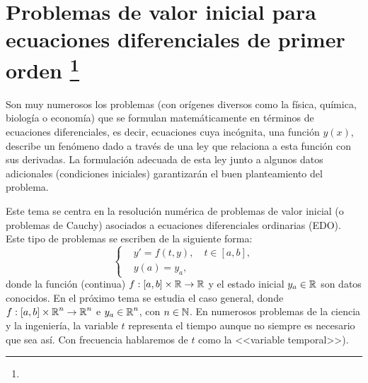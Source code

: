%
%
\renewcommand{\tt}{t}
\newcommand{\yy}{y}
\newcommand{\yn}{{\yy_n}}
\newcommand{\ynn}{{\yy_{n+1}}}
\newcommand{\ta}{a}
\newcommand{\tb}{b}
\newcommand{\tn}{{\tt_n}}
\newcommand{\tnn}{{\tt_{n+1}}}
\newcommand{\zn}{{z_n}}
\newcommand{\znn}{{z_{n+1}}}
\newcommand{\ycero}{{y_a}}
\newcommand{\sol}{y}
\newcommand{\lipschitz}{$y$--Lipschitz\xspace}
\newcommand{\locLipschitz}{localmente \lipschitz}
\newcommand{\globLipschitz}{\lipschitz}
\newcommand{\errCons}{{\cal E}}
\newcommand{\RK}{Runge--Kutta\xspace}
\newcommand{\AB}{Adams--Bashforth\xspace}
\newcommand{\AM}{Adams--Moulton\xspace}

\chapter[Problemas de valor inicial para EDO]
{Problemas de valor inicial para ecuaciones diferenciales de primer
  orden%
  \footnote{\licenseInfo}}

Son muy numerosos los problemas (con orígenes diversos como la física,
química, biología o economía) que se formulan matemáticamente en
términos de ecuaciones diferenciales, es decir, ecuaciones cuya
incógnita, una función $y(x)$, describe un fenómeno dado a través de
una ley que relaciona a esta función con sus derivadas. La formulación
adecuada de esta ley junto a algunos datos adicionales (condiciones
iniciales) garantizarán el buen planteamiento del problema.

Este tema se centra en la resolución numérica de problemas de valor
inicial (o problemas de Cauchy) asociados a ecuaciones diferenciales
ordinarias (EDO). Este tipo de problemas se escriben de la siguiente
forma:
\begin{equation}
  \label{eq:pvi}
  \tag{PVI}
  \left\{
  \begin{aligned}
    &y' = f(\tt,\yy), \quad \tt\in[\ta,\tb],
    \\
    &y(\ta) = \ycero,
  \end{aligned}
  \right.
\end{equation}
donde la función (continua) $f:[\ta,\tb]\times\Rset\to\Rset$ y el
estado inicial $\ycero\in\Rset$ son datos conocidos. En el próximo
tema se estudia el caso general, donde
$f:[\ta,\tb]\times\Rset^n\to\Rset^n$ e $\ycero\in\Rset^n$, con
$n\in\operatorname{{\mathbb N}}$. En numerosos problemas de la ciencia y la ingeniería, la
variable $\tt$ representa el tiempo aunque no siempre es necesario que
sea así. Con frecuencia hablaremos de $\tt$ como la <<variable
temporal>>).

